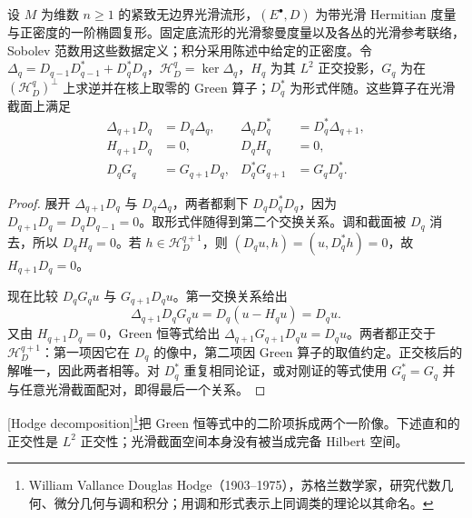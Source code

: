 \begin{lemma}\label{g3:lem:complex-green-commutation}
	设 \(M\) 为维数 \(n\ge1\) 的紧致无边界光滑流形，\((E^\bullet,D)\) 为带光滑 Hermitian 度量与正密度的一阶椭圆复形。固定底流形的光滑黎曼度量以及各丛的光滑参考联络，Sobolev 范数用这些数据定义；积分采用陈述中给定的正密度。令 \(\Delta_q=D_{q-1}D_{q-1}^*+D_q^*D_q\)，\(\mathcal H_D^q=\ker\Delta_q\)，\(H_q\) 为其 \(L^2\) 正交投影，\(G_q\) 为在 \((\mathcal H_D^q)^\perp\) 上求逆并在核上取零的 Green 算子；\(D_q^*\) 为形式伴随。这些算子在光滑截面上满足
	\begin{align*}
		\Delta_{q+1}D_q&=D_q\Delta_q,
		&\Delta_qD_q^*&=D_q^*\Delta_{q+1},\\
		H_{q+1}D_q&=0,
		&D_qH_q&=0,\\
		D_qG_q&=G_{q+1}D_q,
		&D_q^*G_{q+1}&=G_qD_q^*.
	\end{align*}
\end{lemma}
\begin{proof}
	展开 \(\Delta_{q+1}D_q\) 与 \(D_q\Delta_q\)，两者都剩下 \(D_qD_q^*D_q\)，因为 \(D_{q+1}D_q=D_qD_{q-1}=0\)。取形式伴随得到第二个交换关系。调和截面被 \(D_q\) 消去，所以 \(D_qH_q=0\)。若 \(h\in\mathcal H_D^{q+1}\)，则
	\((D_qu,h)=(u,D_q^*h)=0\)，故 \(H_{q+1}D_q=0\)。

	现在比较 \(D_qG_qu\) 与 \(G_{q+1}D_qu\)。第一交换关系给出
	\[
		\Delta_{q+1}D_qG_qu=D_q(u-H_qu)=D_qu.
	\]
	又由 \(H_{q+1}D_q=0\)，Green 恒等式给出
	\(\Delta_{q+1}G_{q+1}D_qu=D_qu\)。两者都正交于 \(\mathcal H_D^{q+1}\)：第一项因它在 \(D_q\) 的像中，第二项因 Green 算子的取值约定。正交核后的解唯一，因此两者相等。对 \(D_q^*\) 重复相同论证，或对刚证的等式使用 \(G_q^*=G_q\) 并与任意光滑截面配对，即得最后一个关系。
\end{proof}

[Hodge decomposition]\footnote{William Vallance Douglas Hodge（1903--1975），苏格兰数学家，研究代数几何、微分几何与调和积分；用调和形式表示上同调类的理论以其命名。}把 Green 恒等式中的二阶项拆成两个一阶像。下述直和的正交性是 \(L^2\) 正交性；光滑截面空间本身没有被当成完备 Hilbert 空间。

